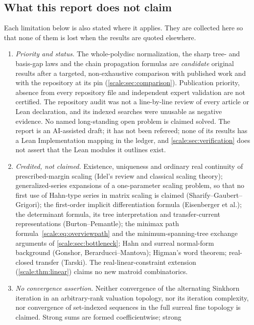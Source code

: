 \documentclass[11pt,a4paper]{article}
\numberwithin{equation}{section}
\theoremstyle{definition}
\begin{document}
\subsection{What this report does not claim}\label{scale:sec:nonclaims}
Each limitation below is also stated where it applies. They are collected
here so that none of them is lost when the results are quoted elsewhere.
\begin{enumerate}[label=(N\arabic*),leftmargin=3.2em]
\item \emph{Priority and status.} The whole-polydisc normalization, the
sharp tree- and basis-gap laws and the chain propagation formulas are
\emph{candidate} original results after a targeted, non-exhaustive
comparison with published work and with the repository at its pin
(\cref{scale:sec:comparison}). Publication priority, absence from every
repository file and independent expert validation are not certified. The
repository audit was not a line-by-line review of every article or Lean
declaration, and its indexed searches were unusable as negative evidence.
No named long-standing open problem is claimed solved. The report is an
AI-assisted draft; it has not been refereed; none of its results has a Lean
Implementation mapping in the ledger, and \cref{scale:sec:verification} does not assert that the
Lean modules it outlines exist.
\item \emph{Credited, not claimed.} Existence, uniqueness and ordinary
real continuity of prescribed-margin scaling (Idel's review and classical
scaling theory); generalized-series expansions of a one-parameter scaling
problem, so that no first use of Hahn-type series in matrix scaling is
claimed (Sharify--Gaubert--Grigori); the first-order implicit
differentiation formula (Eisenberger et al.); the determinant formula, its
tree interpretation and transfer-current representations (Burton--Pemantle);
the minimax path formula~\eqref{scale:eq:overviewpath} and the
minimum-spanning-tree exchange arguments of \cref{scale:sec:bottleneck};
Hahn and surreal normal-form background (Gonshor, Berarducci--Mantova);
Higman's word theorem; real-closed transfer (Tarski). The real-linear-constraint
extension (\cref{scale:thm:linear}) claims no new matroid combinatorics.
\item \emph{No convergence assertion.} Neither convergence of the alternating
Sinkhorn iteration in an arbitrary-rank valuation topology, nor its iteration
complexity, nor convergence of set-indexed sequences in the full surreal fine
topology is claimed. Strong sums are formed coefficientwise; strong

\end{enumerate}
\end{document}
